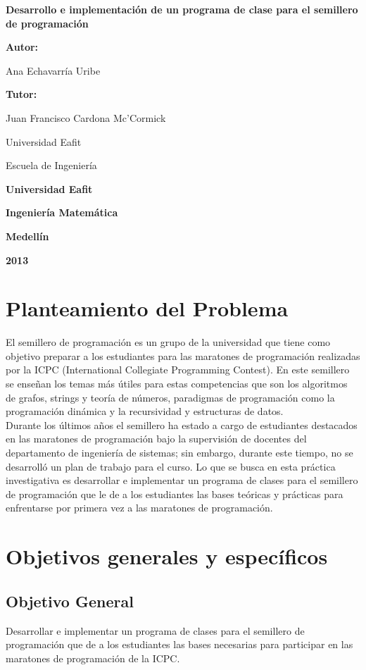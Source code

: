\documentclass[11pt, oneside]{article}
\theoremstyle{definition}
\theoremstyle{remark}
\newcommand\portada{
\begin{titlepage}
		\begin{center}
			{\large \bf Desarrollo e implementación de un programa de clase para el semillero de programación }
			\vfill
			{\large\bf Autor: \par}
			{\large Ana Echavarría Uribe\par}
			{\large\bf Tutor: \par}
			{\large Juan Francisco Cardona Mc'Cormick \par Universidad Eafit \par Escuela de Ingeniería \par}
			\vfill
			{\large\bf Universidad Eafit  \par}
			{\large\bf Ingeniería Matemática \par}
			{\large\bf Medellín\par}
			{\large\bf 2013 \par}
		\end{center}
\end{titlepage}
}
\begin{document}
\portada


\renewcommand\contentsname{\centering Tabla de Contenidos}
\tableofcontents
\clearpage

\section{Planteamiento del Problema}
El semillero de programación es un grupo de la universidad que tiene como objetivo preparar a los estudiantes para las maratones de programación realizadas por la ICPC (International Collegiate Programming Contest). En este semillero se enseñan los temas más útiles para estas competencias que son los algoritmos de grafos, strings y teoría de números, paradigmas de programación como la programación dinámica y la recursividad y estructuras de datos.\\
Durante los últimos años el semillero ha estado a cargo de estudiantes destacados en las maratones de programación bajo la supervisión de docentes del departamento de ingeniería de sistemas; sin embargo, durante este tiempo, no se desarrolló un plan de trabajo para el curso. Lo que se busca en esta práctica investigativa es desarrollar e implementar un programa de clases para el semillero de programación que le de a los estudiantes las bases teóricas y prácticas para enfrentarse por primera vez a las maratones de programación.

\section{Objetivos generales y específicos}

\subsection{Objetivo General}
Desarrollar e implementar un programa de clases para el semillero de programación que de a los estudiantes las bases necesarias para participar en las maratones de programación de la ICPC.
\end{document}
